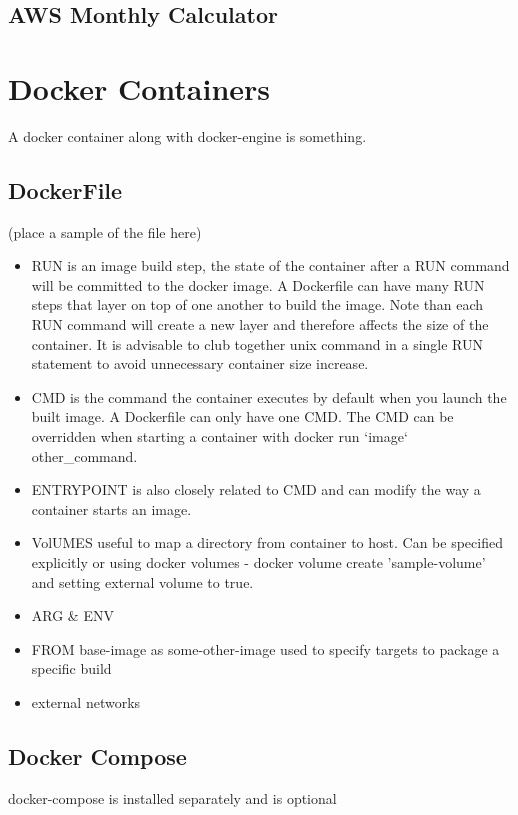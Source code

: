 \pagebreak

\subsection{AWS Monthly Calculator}

\pagebreak
\section{Docker Containers}\label{dockerintro}
A docker container along with docker-engine is something. 

\subsection{DockerFile}
(place a sample of the file here)
\begin{itemize}
\item RUN is an image build step, the state of the container after a RUN command will be committed to the docker image.
  A Dockerfile can have many RUN steps that layer on top of one another to build the image. Note than each RUN command
  will create a new layer and therefore affects the size of the container. It is advisable to club together unix command
  in a single RUN statement to avoid unnecessary container size increase.
\item CMD is the command the container executes by default when you launch the built image.
  A Dockerfile can only have one CMD. The CMD can be overridden when starting a container with docker run
  `image` other_command.
\item ENTRYPOINT is also closely related to CMD and can modify the way a container starts an image.
\item VolUMES useful to map a directory from container to host. Can be specified explicitly or using docker
  volumes - docker volume create 'sample-volume' and setting external volume to true.
\item ARG & ENV
\item FROM base-image as some-other-image used to specify targets to package a specific build
\item external networks
\end{itemize}


\subsection{Docker Compose}
docker-compose is installed separately and is optional